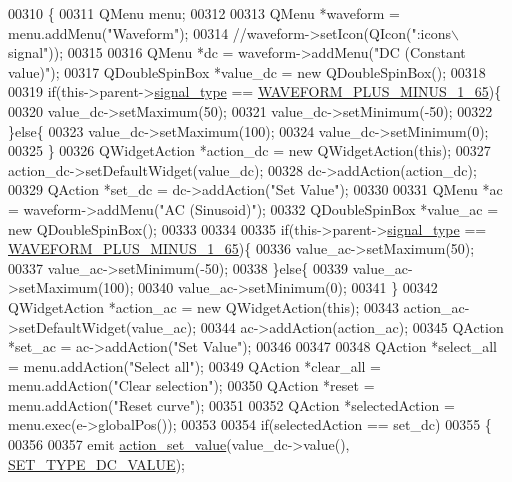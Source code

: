 \begin{DoxyCode}
00310 \{
00311     QMenu menu;
00312 
00313     QMenu   *waveform = menu.addMenu(\textcolor{stringliteral}{"Waveform"});
00314              \textcolor{comment}{//waveform->setIcon(QIcon(":icons\(\backslash\)signal"));}
00315 
00316     QMenu   *dc = waveform->addMenu(\textcolor{stringliteral}{"DC (Constant value)"});
00317     QDoubleSpinBox *value\_dc = \textcolor{keyword}{new} QDoubleSpinBox();
00318 
00319     \textcolor{keywordflow}{if}(this->parent->\hyperlink{a00004_a070edaec5aee6ba1f5a6866bc32c8ce4}{signal\_type} == \hyperlink{a00034_a0923d3b365a36e1e8c401cec964aa36f}{WAVEFORM\_PLUS\_MINUS\_1\_65})\{
00320     value\_dc->setMaximum(50);
00321     value\_dc->setMinimum(-50);
00322     \}\textcolor{keywordflow}{else}\{
00323     value\_dc->setMaximum(100);
00324     value\_dc->setMinimum(0);
00325     \}
00326     QWidgetAction *action\_dc = \textcolor{keyword}{new} QWidgetAction(\textcolor{keyword}{this});
00327     action\_dc->setDefaultWidget(value\_dc);
00328     dc->addAction(action\_dc);
00329     QAction *set\_dc = dc->addAction(\textcolor{stringliteral}{"Set Value"});
00330 
00331     QMenu   *ac = waveform->addMenu(\textcolor{stringliteral}{"AC (Sinusoid)"});
00332     QDoubleSpinBox *value\_ac = \textcolor{keyword}{new} QDoubleSpinBox();
00333 
00334 
00335     \textcolor{keywordflow}{if}(this->parent->\hyperlink{a00004_a070edaec5aee6ba1f5a6866bc32c8ce4}{signal\_type} == \hyperlink{a00034_a0923d3b365a36e1e8c401cec964aa36f}{WAVEFORM\_PLUS\_MINUS\_1\_65})\{
00336     value\_ac->setMaximum(50);
00337     value\_ac->setMinimum(-50);
00338     \}\textcolor{keywordflow}{else}\{
00339     value\_ac->setMaximum(100);
00340     value\_ac->setMinimum(0);
00341     \}
00342     QWidgetAction *action\_ac = \textcolor{keyword}{new} QWidgetAction(\textcolor{keyword}{this});
00343     action\_ac->setDefaultWidget(value\_ac);
00344     ac->addAction(action\_ac);
00345     QAction *set\_ac = ac->addAction(\textcolor{stringliteral}{"Set Value"});
00346 
00347 
00348     QAction *select\_all = menu.addAction(\textcolor{stringliteral}{"Select all"});
00349     QAction *clear\_all = menu.addAction(\textcolor{stringliteral}{"Clear selection"});
00350     QAction *reset = menu.addAction(\textcolor{stringliteral}{"Reset curve"});
00351 
00352     QAction *selectedAction = menu.exec(e->globalPos());
00353 
00354     \textcolor{keywordflow}{if}(selectedAction == set\_dc)
00355     \{
00356 
00357         emit \hyperlink{a00024_a886f07f2c612121bec703581f9398a10}{action\_set\_value}(value\_dc->value(),
      \hyperlink{a00034_a347f6ec80828b93988d22989c0df015f}{SET\_TYPE\_DC\_VALUE});

\end{DoxyCode}
